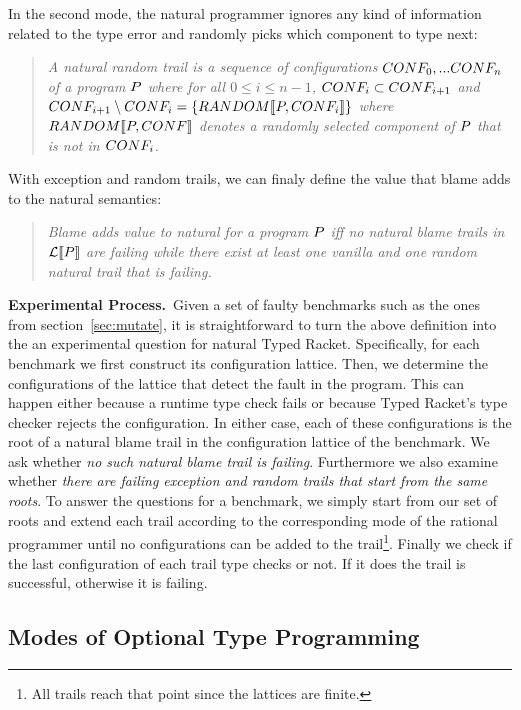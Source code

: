 In the second mode, the natural programmer
ignores any kind of information related to the type error and randomly
picks which component to type next:
\begin{quote}
\it 
A natural random trail
is a sequence of configurations $CONF_0,...CONF_n$ of a program
$P$ where for all $0 \leq i \leq n - 1$, $CONF_i \subset CONF_{i+1}$ and
$CONF_{i+1} \setminus CONF_i = \{RANDOM\llbracket P, CONF_i\rrbracket\}$
where $RANDOM\llbracket P, CONF\rrbracket$ denotes a randomly selected component of $P$
that is not in $CONF_i$.
\end{quote}
\noindent

With exception and random trails, we can finaly define the value that blame
adds to the natural semantics: 
\begin{quote}
\it
  Blame adds value to natural for a program $P$ iff 
  no natural blame trails in  $\mathcal{L}\llbracket P\rrbracket$ are failing while 
 there exist at least one vanilla and one random natural trail that is
  failing.
\end{quote}

 

\noindent
{\bf Experimental Process.}~Given a set of faulty benchmarks such as the
ones from section~\ref{sec:mutate}, it is straightforward to turn the
above definition into the an experimental question for natural Typed Racket. 
Specifically, for
each benchmark we first construct its configuration lattice. Then, we
determine the configurations of the lattice that detect the fault in the
program. This can happen either because a runtime type check fails or
because Typed Racket's type checker rejects the configuration. In either
case,  each of these configurations is the root of a natural blame trail
in the configuration lattice of the benchmark. We ask whether
\emph{no such natural blame trail is failing}.  Furthermore  we also
examine whether \emph{there are failing exception and random trails that start
from the same roots}.  To answer the questions for a
benchmark, we simply start from our set of roots and extend each
trail according to the corresponding mode of the rational programmer
until no configurations can be added to the trail\footnote{All trails
reach that point since the lattices are finite.}. Finally we check if the
last configuration of each trail type checks or not. If it does the trail
is successful, otherwise it is failing. 

\subsection{Modes of Optional Type Programming} \label{sub:transient}

